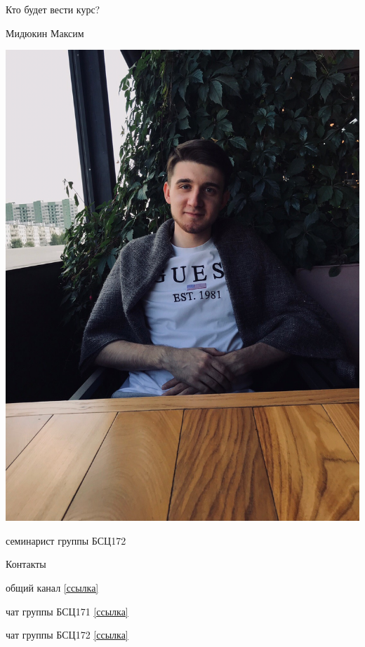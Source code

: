 \documentclass[notes,12pt, aspectratio=169]{beamer}
\newenvironment{wideitemize}{\itemize\addtolength{\itemsep}{10pt}}{\enditemize}
\begin{document}
\begin{frame}{Кто будет вести курс?}
	\begin{minipage}{0.45\textwidth}
		\centering Мидюкин Максим
		
		\centering \includegraphics[scale = 0.13]{max.jpg}
	\end{minipage}
	\hfill
	\begin{minipage}{0.45\textwidth}
		\begin{wideitemize}
			
			\item семинарист группы БСЦ172
			
			
		\end{wideitemize} 
	\end{minipage}
\end{frame}

\begin{frame}{Контакты}
	\begin{wideitemize}
		
		\item общий канал \hyperref{https://t.me/joinchat/AAAAAEnPA-UXj5C99NFdbA}{}{}{[ссылка]}
		
		\item чат группы  БСЦ171 \hyperref{}{}{}{[ссылка]}
		
		\item чат группы БСЦ172 \hyperref{}{}{}{[ссылка]}
		
	\end{wideitemize} 
\end{frame}
\end{document}
